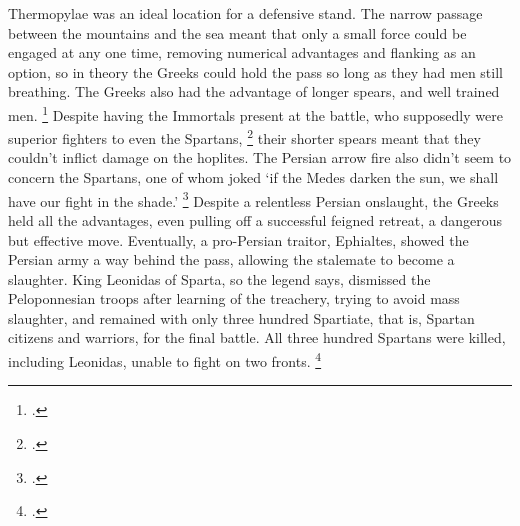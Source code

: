 \documentclass[twoside, a4paper, 12pt]{article}
\begin{document}
\par\vspace{1em}

Thermopylae was an ideal location for a defensive stand. The narrow passage
between the mountains and the sea meant that only a small force could be engaged
at any one time, removing numerical advantages and flanking
as an option, so in theory the Greeks could hold the pass
so long as they had men still breathing. The Greeks also had the advantage
of longer spears, and well trained men. \footcite[135]{green_corner_freedom}
Despite having the Immortals present
at the battle, who supposedly were superior fighters to even the Spartans,
\footcite{kim_grecopersia_2017}
their shorter spears meant that they couldn't inflict damage on the hoplites.
The Persian arrow fire also didn't seem to concern the Spartans, one of
whom joked `if the Medes darken the sun, we shall have our fight in the shade.'
\footcite[Book 7.226]{herodotus_1920}
Despite a relentless Persian onslaught, the Greeks held all the advantages,
even pulling off a successful feigned retreat, a dangerous but effective move.
Eventually, a pro-Persian traitor, Ephialtes, showed the Persian army a way behind the pass,
allowing the stalemate to become a slaughter. King Leonidas of Sparta, so the
legend says, dismissed the Peloponnesian troops after learning of the treachery,
trying to avoid mass slaughter, and remained with only three hundred Spartiate,
that is, Spartan citizens and warriors, for the final battle.
All three hundred Spartans were killed, including Leonidas,
unable to fight on two fronts. \footcite[139-42]{green_corner_freedom}

\par\vspace{1em}
\end{document}

